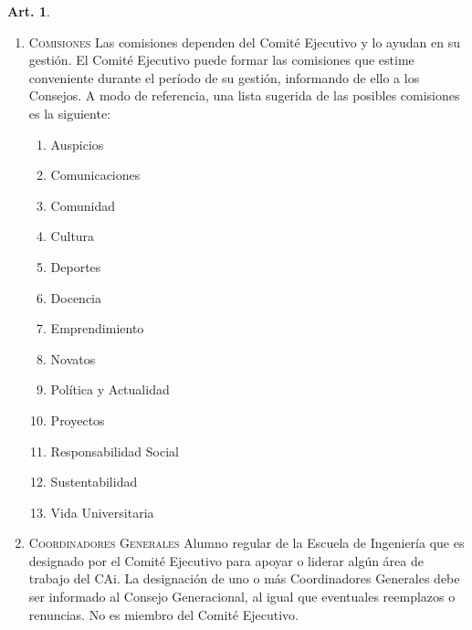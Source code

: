 \documentclass[letterpaper,11pt]{article}
\theoremstyle{definition}%
\newtheorem{art}{Art.} %
\begin{document}
\begin{art}
\begin{enumerate}
		\item \textsc{Comisiones} Las comisiones dependen del Comité Ejecutivo y lo ayudan en su gestión. El Comité Ejecutivo puede formar las comisiones que estime conveniente durante el período de su gestión, informando de ello a los Consejos. A modo de referencia, una lista sugerida de las posibles comisiones es la siguiente:
		      \begin{enumerate}
			      \item Auspicios
			      \item Comunicaciones
			      \item Comunidad
			      \item Cultura
			      \item Deportes
			      \item Docencia
			      \item Emprendimiento
			      \item Novatos
			      \item Política y Actualidad
			      \item Proyectos
			      \item Responsabilidad Social
			      \item Sustentabilidad
			      \item Vida Universitaria
		      \end{enumerate}

		\item \textsc{Coordinadores Generales} Alumno regular de la Escuela de Ingeniería que es designado por el Comité Ejecutivo para apoyar o liderar algún área de trabajo del CAi. La designación de uno o más Coordinadores Generales debe ser informado al Consejo Generacional, al igual que eventuales reemplazos o renuncias. No es miembro del Comité Ejecutivo.
	\end{enumerate}
\end{art}
\end{document}
